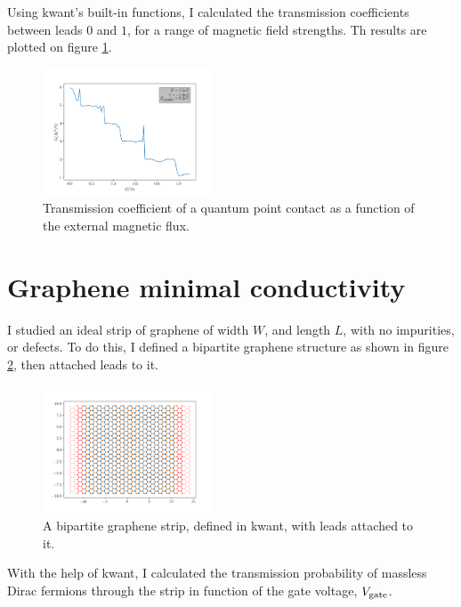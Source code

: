 \documentclass[11pt, a4paper, twocolumn]{article}
\begin{document}
Using kwant's built-in functions, I calculated the transmission coefficients between leads $0$
and $1$, for a range of magnetic field strengths. Th results are plotted on figure \ref{fig:qpc_L10_W5_VS0_2_cond_phi_e1_5}.

\begin{figure}[H]
  \begin{center}
  \includegraphics[width=0.45\textwidth]{./media/qpc_L10_W5_VS0_2_cond_phi_e1_5.png}
  \caption{Transmission coefficient of a quantum point contact as a function of the external magnetic flux.}
  \label{fig:qpc_L10_W5_VS0_2_cond_phi_e1_5}
  \end{center}
\end{figure}

\section*{Graphene minimal conductivity}
I studied an ideal strip of graphene of width $W$, and length $L$, with no impurities, or defects. To do this, 
I defined a bipartite graphene structure as shown in figure \ref{fig:graphene_layer_W=20L=20}, then attached leads
to it. 
\begin{figure}[H]
  \begin{center}
  \includegraphics[width=0.45\textwidth]{./media/graphene_layer_W=20L=20.png}
  \caption{A bipartite graphene strip, defined in kwant, with leads attached to it.}
  \label{fig:graphene_layer_W=20L=20}
  \end{center}
\end{figure}

With the help of kwant, I calculated the transmission probability of massless Dirac fermions through
the strip in function of the gate voltage, $V_{\textnormal{gate}}$.
\end{document}
